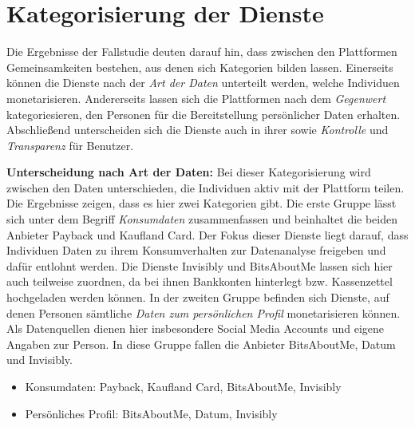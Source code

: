 \section{Kategorisierung der Dienste}
Die Ergebnisse der Fallstudie deuten darauf hin, dass zwischen den Plattformen Gemeinsamkeiten bestehen, aus denen sich Kategorien bilden lassen. Einerseits können die Dienste nach der \textit{Art der Daten} unterteilt werden, welche Individuen monetarisieren. Andererseits lassen sich die Plattformen nach dem \textit{Gegenwert} kategoriesieren, den Personen für die Bereitstellung persönlicher Daten erhalten. Abschließend unterscheiden sich die Dienste auch in ihrer  sowie \textit{Kontrolle} und \textit{Transparenz} für Benutzer. \newline

\noindent \textbf{Unterscheidung nach Art der Daten:} Bei dieser Kategorisierung wird zwischen den Daten unterschieden, die Individuen aktiv mit der Plattform teilen. Die Ergebnisse zeigen, dass es hier zwei Kategorien gibt. Die erste Gruppe lässt sich unter dem Begriff \textit{Konsumdaten} zusammenfassen und beinhaltet die beiden Anbieter Payback und Kaufland Card. Der Fokus dieser Dienste liegt darauf, dass Individuen Daten zu ihrem Konsumverhalten zur Datenanalyse freigeben und dafür entlohnt werden. Die Dienste Invisibly und BitsAboutMe lassen sich hier auch teilweise zuordnen, da bei ihnen Bankkonten hinterlegt bzw. Kassenzettel hochgeladen werden können. In der zweiten Gruppe befinden sich Dienste, auf denen Personen sämtliche \textit{Daten zum persönlichen Profil} monetarisieren können. Als Datenquellen dienen hier insbesondere Social Media Accounts und eigene Angaben zur Person. In diese Gruppe fallen die Anbieter BitsAboutMe, Datum und Invisibly.
\begin{itemize}
    \item Konsumdaten: Payback, Kaufland Card, BitsAboutMe, Invisibly
    \item Persönliches Profil: BitsAboutMe, Datum, Invisibly
\end{itemize}

